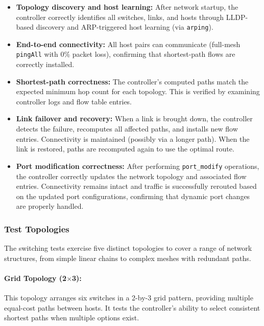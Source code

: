 \documentclass[12pt,a4paper]{article}
\begin{document}
\begin{itemize}[leftmargin=1.5cm]
    \item \textbf{Topology discovery and host learning:} After network startup, the controller correctly identifies all switches, links, and hosts through LLDP-based discovery and ARP-triggered host learning (via \texttt{arping}).
    \item \textbf{End-to-end connectivity:} All host pairs can communicate (full-mesh \texttt{pingAll} with 0\% packet loss), confirming that shortest-path flows are correctly installed.
    \item \textbf{Shortest-path correctness:} The controller's computed paths match the expected minimum hop count for each topology. This is verified by examining controller logs and flow table entries.
    \item \textbf{Link failover and recovery:} When a link is brought down, the controller detects the failure, recomputes all affected paths, and installs new flow entries. Connectivity is maintained (possibly via a longer path). When the link is restored, paths are recomputed again to use the optimal route.
    \item \textbf{Port modification correctness:} After performing \texttt{port\_modify} operations, the controller correctly updates the network topology and associated flow entries. Connectivity remains intact and traffic is successfully rerouted based on the updated port configurations, confirming that dynamic port changes are properly handled.
\end{itemize}

\subsubsection{Test Topologies}

The switching tests exercise five distinct topologies to cover a range of network structures, from simple linear chains to complex meshes with redundant paths.

\paragraph{Grid Topology (2$\times$3):}

This topology arranges six switches in a 2-by-3 grid pattern, providing multiple equal-cost paths between hosts. It tests the controller's ability to select consistent shortest paths when multiple options exist.
\end{document}

